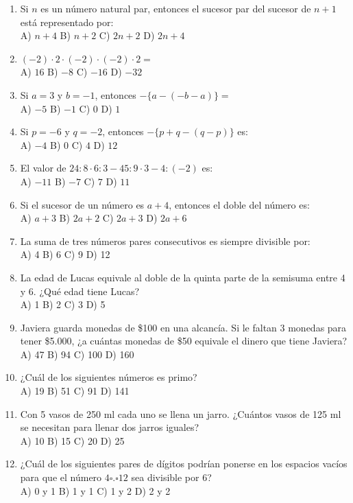 \documentclass[11pt,letterpaper]{article}
\begin{document}
\begin{enumerate}[label=\textbf{\arabic*.}, leftmargin=*, itemsep=7pt]
\item Si $n$ es un número natural par, entonces el sucesor par del sucesor de $n+1$ está representado por: \\ A) $n+4$ \quad B) $n+2$ \quad C) $2n+2$ \quad D) $2n+4$
\item $(-2)\cdot 2\cdot(-2)\cdot(-2)\cdot 2=$\\ A) $16$ \quad B) $-8$ \quad C) $-16$ \quad D) $-32$
\item Si $a=3$ y $b=-1$, entonces $-\{a-(-b-a)\}=$\\ A) $-5$ \quad B) $-1$ \quad C) $0$ \quad D) $1$
\item Si $p=-6$ y $q=-2$, entonces $-\{p+q-(q-p)\}$ es: \\ A) $-4$ \quad B) $0$ \quad C) $4$ \quad D) $12$
\item El valor de $24:8\cdot 6:3-45:9\cdot 3-4:(-2)$ es: \\ A) $-11$ \quad B) $-7$ \quad C) $7$ \quad D) $11$
\item Si el sucesor de un número es $a+4$, entonces el doble del número es: \\ A) $a+3$ \quad B) $2a+2$ \quad C) $2a+3$ \quad D) $2a+6$
\item La suma de tres números pares consecutivos es siempre divisible por: \\ A) 4 \quad B) 6 \quad C) 9 \quad D) 12
\item La edad de Lucas equivale al doble de la quinta parte de la semisuma entre 4 y 6. ¿Qué edad tiene Lucas?\\ A) 1 \quad B) 2 \quad C) 3 \quad D) 5
\item Javiera guarda monedas de \$100 en una alcancía. Si le faltan 3 monedas para tener \$5.000, ¿a cuántas monedas de \$50 equivale el dinero que tiene Javiera?\\ A) 47 \quad B) 94 \quad C) 100 \quad D) 160
\item ¿Cuál de los siguientes números es primo?\\ A) 19 \quad B) 51 \quad C) 91 \quad D) 141
\item Con 5 vasos de 250 ml cada uno se llena un jarro. ¿Cuántos vasos de 125 ml se necesitan para llenar dos jarros iguales?\\ A) 10 \quad B) 15 \quad C) 20 \quad D) 25
\item ¿Cuál de los siguientes pares de dígitos podrían ponerse en los espacios vacíos para que el número $4\square.\square 12$ sea divisible por 6?\\ A) 0 y 1 \quad B) 1 y 1 \quad C) 1 y 2 \quad D) 2 y 2

\end{enumerate}
\end{document}

